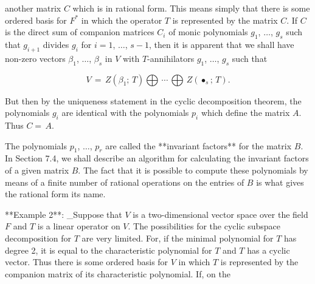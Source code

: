 another matrix \(C\) which is in rational form. This means simply that there is some ordered basis for \(F^{*}\) in which the operator \(T\) is represented by the matrix \(C\). If \(C\) is the direct sum of companion matrices \(C_{i}\) of monic polynomials \(g_{1}\), \(\ldots\), \(g_{s}\) such that \(g_{i+1}\) divides \(g_{i}\) for \(i=1\), \(\ldots\), \(s-1\), then it is apparent that we shall have non-zero vectors \(\beta_{1}\), \(\ldots\), \(\beta_{s}\) in \(V\) with \(T\)-annihilators \(g_{1}\), \(\ldots\), \(g_{s}\) such that

\[V\,=\,Z(\beta_{1};\,T)\bigoplus\,\cdots\,\bigoplus\,Z(\bullet_{s};\,T).\]

But then by the uniqueness statement in the cyclic decomposition theorem, the polynomials \(g_{i}\) are identical with the polynomials \(p_{i}\) which define the matrix \(A\). Thus \(C=\,A\).

The polynomials \(p_{1}\), \(\ldots\), \(p_{r}\) are called the **invariant factors** for the matrix \(B\). In Section 7.4, we shall describe an algorithm for calculating the invariant factors of a given matrix \(B\). The fact that it is possible to compute these polynomials by means of a finite number of rational operations on the entries of \(B\) is what gives the rational form its name.

**Example 2**: _Suppose that \(V\) is a two-dimensional vector space over the field \(F\) and \(T\) is a linear operator on \(V\). The possibilities for the cyclic subspace decomposition for \(T\) are very limited. For, if the minimal polynomial for \(T\) has degree 2, it is equal to the characteristic polynomial for \(T\) and \(T\) has a cyclic vector. Thus there is some ordered basis for \(V\) in which \(T\) is represented by the companion matrix of its characteristic polynomial. If, on the 